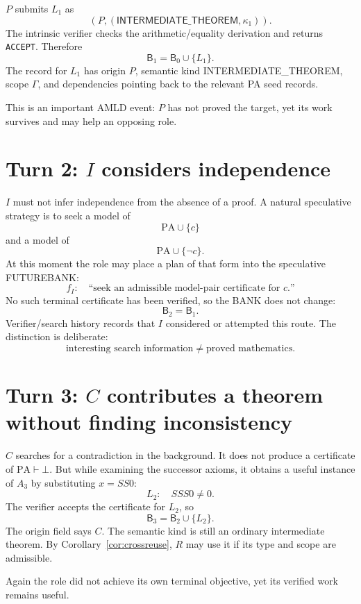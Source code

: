 \documentclass[11pt,openany]{book}
\theoremstyle{definition}
\theoremstyle{remark}
\newcommand{\Bank}{\mathsf{B}}
\begin{document}
$P$ submits $L_1$ as
\[
(P,(\mathsf{INTERMEDIATE\_THEOREM},\kappa_1)).
\]
The intrinsic verifier checks the arithmetic/equality derivation and returns \texttt{ACCEPT}. Therefore
\[
\Bank_1=\Bank_0\cup\{L_1\}.
\]
The record for $L_1$ has origin $P$, semantic kind \textsf{INTERMEDIATE\_THEOREM}, scope $\Gamma$, and dependencies pointing back to the relevant PA seed records.

This is an important AMLD event: $P$ has not proved the target, yet its work survives and may help an opposing role.

\section{Turn 2: \texorpdfstring{$I$}{I} considers independence}
$I$ must not infer independence from the absence of a proof. A natural speculative strategy is to seek a model of
\[
\mathrm{PA}\cup\{c\}
\]
and a model of
\[
\mathrm{PA}\cup\{\neg c\}.
\]
At this moment the role may place a plan of that form into the speculative FUTUREBANK:
\[
f_I:\quad \text{``seek an admissible model-pair certificate for }c\text{.''}
\]
No such terminal certificate has been verified, so the BANK does not change:
\[
\Bank_2=\Bank_1.
\]
Verifier/search history records that $I$ considered or attempted this route. The distinction is deliberate:
\[
\text{interesting search information}\neq\text{proved mathematics}.
\]

\section{Turn 3: \texorpdfstring{$C$}{C} contributes a theorem without finding inconsistency}
$C$ searches for a contradiction in the background. It does not produce a certificate of $\mathrm{PA}\vdash\bot$. But while examining the successor axioms, it obtains a useful instance of $A_3$ by substituting $x=SS0$:
\[
L_2:\quad SSS0\neq0.
\]
The verifier accepts the certificate for $L_2$, so
\[
\Bank_3=\Bank_2\cup\{L_2\}.
\]
The origin field says $C$. The semantic kind is still an ordinary intermediate theorem. By Corollary~\ref{cor:crossreuse}, $R$ may use it if its type and scope are admissible.

Again the role did not achieve its own terminal objective, yet its verified work remains useful.
\end{document}
